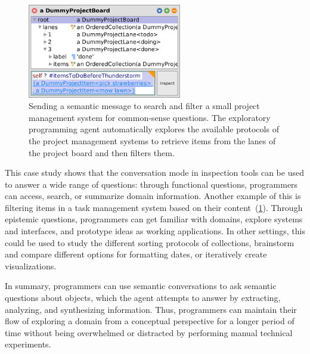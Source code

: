 \begin{figure}
	\centering
	\includegraphics[width=0.6\textwidth]{chapters/08_application/02_conversation/project.png}
	\caption[Sending a semantic message to search and filter a small project management system for common-sense questions.]{
		Sending a semantic message to search and filter a small project management system for common-sense questions.
		The exploratory programming agent automatically explores the available protocols of the project management systems to retrieve items from the lanes of the project board and then filters them.
	}
	\label{fig:application/conversation/project}
\end{figure}

This case study shows that the conversation mode in inspection tools can be used to answer a wide range of questions:
through functional questions, programmers can access, search, or summarize domain information.
Another example of this is filtering items in a task management system based on their content~(\cref{fig:application/conversation/project}).
Through epistemic questions, programmers can get familiar with domains, explore systems and interfaces, and prototype ideas as working applications.
In other settings, this could be used to study the different sorting protocols of collections, brainstorm and compare different options for formatting dates, or iteratively create visualizations.

In summary, programmers can use semantic conversations to ask semantic questions about objects, which the agent attempts to answer by extracting, analyzing, and synthesizing information.
Thus, programmers can maintain their flow of exploring a domain from a conceptual perspective for a longer period of time without being overwhelmed or distracted by performing manual technical experiments.
